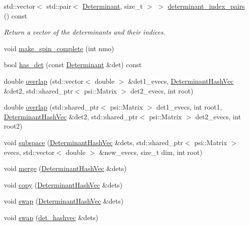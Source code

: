 \begin{DoxyCompactItemize}
\item 
std\+::vector$<$ std\+::pair$<$ \mbox{\hyperlink{namespaceforte_a2076c63fd7b8732004d9e1442ce527c1}{Determinant}}, size\+\_\+t $>$ $>$ \mbox{\hyperlink{classforte_1_1_determinant_hash_vec_a4d94caa7afe0fe09cac71bc38b585720}{determinant\+\_\+index\+\_\+pairs}} () const
\begin{DoxyCompactList}\small\item\em Return a vector of the determinants and their indices. \end{DoxyCompactList}\item 
void \mbox{\hyperlink{classforte_1_1_determinant_hash_vec_aadea7fce2c583d922a696093d2888619}{make\+\_\+spin\+\_\+complete}} (int nmo)
\item 
bool \mbox{\hyperlink{classforte_1_1_determinant_hash_vec_a683b6f9a2be21955d7caa0181cf88f77}{has\+\_\+det}} (const \mbox{\hyperlink{namespaceforte_a2076c63fd7b8732004d9e1442ce527c1}{Determinant}} \&det) const
\item 
double \mbox{\hyperlink{classforte_1_1_determinant_hash_vec_ad4f538593c5f1d98da9a73e5462d3bfa}{overlap}} (std\+::vector$<$ double $>$ \&det1\+\_\+evecs, \mbox{\hyperlink{classforte_1_1_determinant_hash_vec}{Determinant\+Hash\+Vec}} \&det2, std\+::shared\+\_\+ptr$<$ psi\+::\+Matrix $>$ det2\+\_\+evecs, int root)
\item 
double \mbox{\hyperlink{classforte_1_1_determinant_hash_vec_a1168daa5c587057db556210cee6504a6}{overlap}} (std\+::shared\+\_\+ptr$<$ psi\+::\+Matrix $>$ det1\+\_\+evecs, int root1, \mbox{\hyperlink{classforte_1_1_determinant_hash_vec}{Determinant\+Hash\+Vec}} \&det2, std\+::shared\+\_\+ptr$<$ psi\+::\+Matrix $>$ det2\+\_\+evecs, int root2)
\item 
void \mbox{\hyperlink{classforte_1_1_determinant_hash_vec_ab45b9bb4b2b10262fb8b5fc0394dd954}{subspace}} (\mbox{\hyperlink{classforte_1_1_determinant_hash_vec}{Determinant\+Hash\+Vec}} \&dets, std\+::shared\+\_\+ptr$<$ psi\+::\+Matrix $>$ evecs, std\+::vector$<$ double $>$ \&new\+\_\+evecs, size\+\_\+t dim, int root)
\item 
void \mbox{\hyperlink{classforte_1_1_determinant_hash_vec_a76bbc710a7fe975f008a5b41cc10f85c}{merge}} (\mbox{\hyperlink{classforte_1_1_determinant_hash_vec}{Determinant\+Hash\+Vec}} \&dets)
\item 
void \mbox{\hyperlink{classforte_1_1_determinant_hash_vec_a1c25ea4516f605640e8c7e134b13aecd}{copy}} (\mbox{\hyperlink{classforte_1_1_determinant_hash_vec}{Determinant\+Hash\+Vec}} \&dets)
\item 
void \mbox{\hyperlink{classforte_1_1_determinant_hash_vec_a03d8f6394ae12862b2e4c782dcab82fa}{swap}} (\mbox{\hyperlink{classforte_1_1_determinant_hash_vec}{Determinant\+Hash\+Vec}} \&dets)
\item 
void \mbox{\hyperlink{classforte_1_1_determinant_hash_vec_af5b7b59cac7ddccd0c0b595b9bb3e6d2}{swap}} (\mbox{\hyperlink{namespaceforte_aee00ff2f656f0aa613d3f9f1ba01cad5}{det\+\_\+hashvec}} \&dets)
\end{DoxyCompactItemize}
